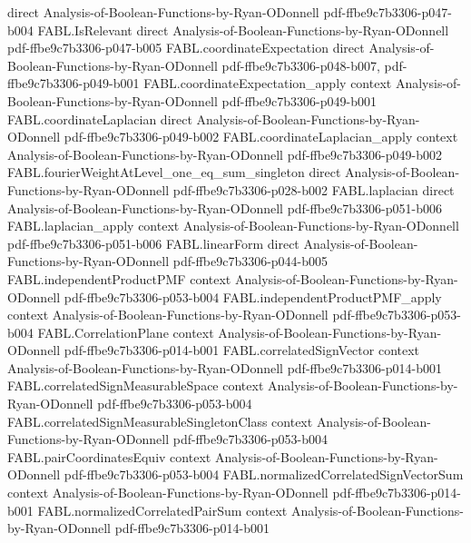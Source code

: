 \begin{theorem}
  {direct}
  {Analysis-of-Boolean-Functions-by-Ryan-ODonnell}
  {pdf-ffbe9c7b3306-p047-b004}
\proofstep
  {FABL.IsRelevant}
  {direct}
  {Analysis-of-Boolean-Functions-by-Ryan-ODonnell}
  {pdf-ffbe9c7b3306-p047-b005}
\proofstep
  {FABL.coordinateExpectation}
  {direct}
  {Analysis-of-Boolean-Functions-by-Ryan-ODonnell}
  {pdf-ffbe9c7b3306-p048-b007,
    pdf-ffbe9c7b3306-p049-b001}
\proofstep
  {FABL.coordinateExpectation_apply}
  {context}
  {Analysis-of-Boolean-Functions-by-Ryan-ODonnell}
  {pdf-ffbe9c7b3306-p049-b001}
\proofstep
  {FABL.coordinateLaplacian}
  {direct}
  {Analysis-of-Boolean-Functions-by-Ryan-ODonnell}
  {pdf-ffbe9c7b3306-p049-b002}
\proofstep
  {FABL.coordinateLaplacian_apply}
  {context}
  {Analysis-of-Boolean-Functions-by-Ryan-ODonnell}
  {pdf-ffbe9c7b3306-p049-b002}
\proofstep
  {FABL.fourierWeightAtLevel_one_eq_sum_singleton}
  {direct}
  {Analysis-of-Boolean-Functions-by-Ryan-ODonnell}
  {pdf-ffbe9c7b3306-p028-b002}
\proofstep
  {FABL.laplacian}
  {direct}
  {Analysis-of-Boolean-Functions-by-Ryan-ODonnell}
  {pdf-ffbe9c7b3306-p051-b006}
\proofstep
  {FABL.laplacian_apply}
  {context}
  {Analysis-of-Boolean-Functions-by-Ryan-ODonnell}
  {pdf-ffbe9c7b3306-p051-b006}
\proofstep
  {FABL.linearForm}
  {direct}
  {Analysis-of-Boolean-Functions-by-Ryan-ODonnell}
  {pdf-ffbe9c7b3306-p044-b005}
\proofstep
  {FABL.independentProductPMF}
  {context}
  {Analysis-of-Boolean-Functions-by-Ryan-ODonnell}
  {pdf-ffbe9c7b3306-p053-b004}
\proofstep
  {FABL.independentProductPMF_apply}
  {context}
  {Analysis-of-Boolean-Functions-by-Ryan-ODonnell}
  {pdf-ffbe9c7b3306-p053-b004}
\proofstep
  {FABL.CorrelationPlane}
  {context}
  {Analysis-of-Boolean-Functions-by-Ryan-ODonnell}
  {pdf-ffbe9c7b3306-p014-b001}
\proofstep
  {FABL.correlatedSignVector}
  {context}
  {Analysis-of-Boolean-Functions-by-Ryan-ODonnell}
  {pdf-ffbe9c7b3306-p014-b001}
\proofstep
  {FABL.correlatedSignMeasurableSpace}
  {context}
  {Analysis-of-Boolean-Functions-by-Ryan-ODonnell}
  {pdf-ffbe9c7b3306-p053-b004}
\proofstep
  {FABL.correlatedSignMeasurableSingletonClass}
  {context}
  {Analysis-of-Boolean-Functions-by-Ryan-ODonnell}
  {pdf-ffbe9c7b3306-p053-b004}
\proofstep
  {FABL.pairCoordinatesEquiv}
  {context}
  {Analysis-of-Boolean-Functions-by-Ryan-ODonnell}
  {pdf-ffbe9c7b3306-p053-b004}
\proofstep
  {FABL.normalizedCorrelatedSignVectorSum}
  {context}
  {Analysis-of-Boolean-Functions-by-Ryan-ODonnell}
  {pdf-ffbe9c7b3306-p014-b001}
\proofstep
  {FABL.normalizedCorrelatedPairSum}
  {context}
  {Analysis-of-Boolean-Functions-by-Ryan-ODonnell}
  {pdf-ffbe9c7b3306-p014-b001}
\proofstep

\end{theorem}
